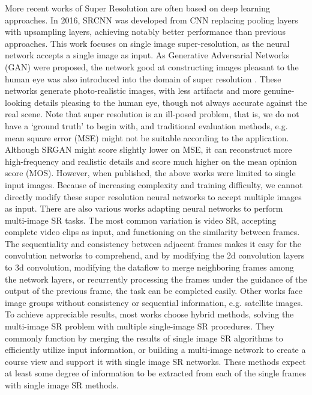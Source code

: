 More recent works of Super Resolution are often based on deep learning approaches. In 2016, SRCNN \cite{dong2015image} was developed from CNN replacing pooling layers with upsampling layers, achieving notably better performance than previous approaches. This work focuses on single image super-resolution, as the neural network accepts a single image as input. As Generative Adversarial Networks (GAN) were proposed, the network good at constructing images pleasant to the human eye was also introduced into the domain of super resolution \cite{ledig2017photo}. These networks generate photo-realistic images, with less artifacts and more genuine-looking details pleasing to the human eye, though not always accurate against the real scene. Note that super resolution is an ill-posed problem, that is, we do not have a ‘ground truth’ to begin with, and traditional evaluation methods, e.g. mean square error (MSE) might not be suitable according to the application. Although SRGAN might score slightly lower on MSE, it can reconstruct more high-frequency and realistic details and score much higher on the mean opinion score (MOS). However, when published, the above works were limited to single input images. Because of increasing complexity and training difficulty, we cannot directly modify these super resolution neural networks to accept multiple images as input. There are also various works adapting neural networks to perform multi-image SR tasks. The most common variation is video SR\cite{shi2016real, kappeler2016video}, accepting complete video clips as input, and functioning on the similarity between frames. The sequentiality and consistency between adjacent frames makes it easy for the convolution networks to comprehend, and by modifying the 2d convolution layers to 3d convolution\cite{caballero2017real}, modifying the dataflow to merge neighboring frames among the network layers\cite{huang2017video}, or recurrently processing the frames under the guidance of the output of the previous frame\cite{sajjadi2018frame}, the task can be completed easily. Other works face image groups without consistency or sequential information, e.g. satellite images. To achieve appreciable results, most works choose hybrid methods, solving the multi-image SR problem with multiple single-image SR procedures. They commonly function by merging the results of single image SR algorithms to efficiently utilize input information\cite{kawulok2019deep}, or building a multi-image network to create a course view and support it with single image SR networks\cite{8834937}. These methods expect at least some degree of information to be extracted from each of the single frames with single image SR methods.

